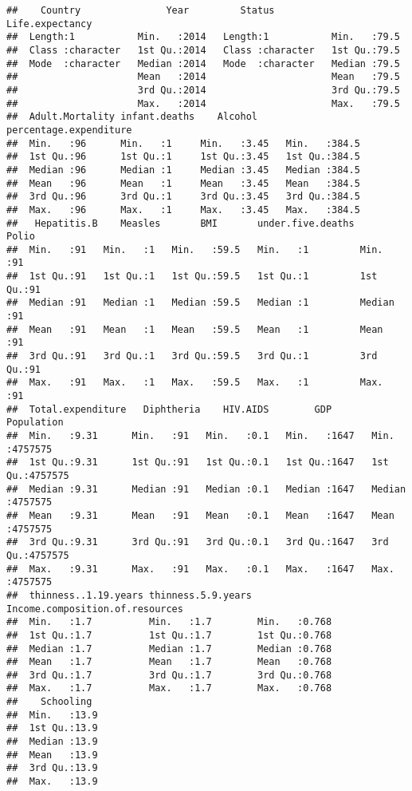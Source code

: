 \documentclass[
]{article}
\begin{document}
\begin{verbatim}
##    Country               Year         Status          Life.expectancy
##  Length:1           Min.   :2014   Length:1           Min.   :79.5   
##  Class :character   1st Qu.:2014   Class :character   1st Qu.:79.5   
##  Mode  :character   Median :2014   Mode  :character   Median :79.5   
##                     Mean   :2014                      Mean   :79.5   
##                     3rd Qu.:2014                      3rd Qu.:79.5   
##                     Max.   :2014                      Max.   :79.5   
##  Adult.Mortality infant.deaths    Alcohol     percentage.expenditure
##  Min.   :96      Min.   :1     Min.   :3.45   Min.   :384.5         
##  1st Qu.:96      1st Qu.:1     1st Qu.:3.45   1st Qu.:384.5         
##  Median :96      Median :1     Median :3.45   Median :384.5         
##  Mean   :96      Mean   :1     Mean   :3.45   Mean   :384.5         
##  3rd Qu.:96      3rd Qu.:1     3rd Qu.:3.45   3rd Qu.:384.5         
##  Max.   :96      Max.   :1     Max.   :3.45   Max.   :384.5         
##   Hepatitis.B    Measles       BMI       under.five.deaths     Polio   
##  Min.   :91   Min.   :1   Min.   :59.5   Min.   :1         Min.   :91  
##  1st Qu.:91   1st Qu.:1   1st Qu.:59.5   1st Qu.:1         1st Qu.:91  
##  Median :91   Median :1   Median :59.5   Median :1         Median :91  
##  Mean   :91   Mean   :1   Mean   :59.5   Mean   :1         Mean   :91  
##  3rd Qu.:91   3rd Qu.:1   3rd Qu.:59.5   3rd Qu.:1         3rd Qu.:91  
##  Max.   :91   Max.   :1   Max.   :59.5   Max.   :1         Max.   :91  
##  Total.expenditure   Diphtheria    HIV.AIDS        GDP         Population     
##  Min.   :9.31      Min.   :91   Min.   :0.1   Min.   :1647   Min.   :4757575  
##  1st Qu.:9.31      1st Qu.:91   1st Qu.:0.1   1st Qu.:1647   1st Qu.:4757575  
##  Median :9.31      Median :91   Median :0.1   Median :1647   Median :4757575  
##  Mean   :9.31      Mean   :91   Mean   :0.1   Mean   :1647   Mean   :4757575  
##  3rd Qu.:9.31      3rd Qu.:91   3rd Qu.:0.1   3rd Qu.:1647   3rd Qu.:4757575  
##  Max.   :9.31      Max.   :91   Max.   :0.1   Max.   :1647   Max.   :4757575  
##  thinness..1.19.years thinness.5.9.years Income.composition.of.resources
##  Min.   :1.7          Min.   :1.7        Min.   :0.768                  
##  1st Qu.:1.7          1st Qu.:1.7        1st Qu.:0.768                  
##  Median :1.7          Median :1.7        Median :0.768                  
##  Mean   :1.7          Mean   :1.7        Mean   :0.768                  
##  3rd Qu.:1.7          3rd Qu.:1.7        3rd Qu.:0.768                  
##  Max.   :1.7          Max.   :1.7        Max.   :0.768                  
##    Schooling   
##  Min.   :13.9  
##  1st Qu.:13.9  
##  Median :13.9  
##  Mean   :13.9  
##  3rd Qu.:13.9  
##  Max.   :13.9
\end{verbatim}
\end{document}
